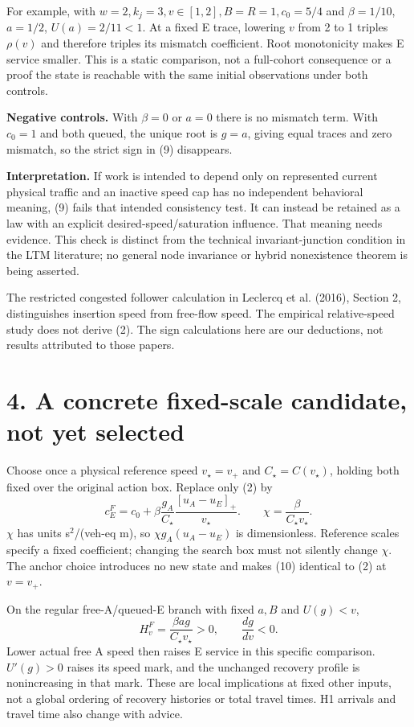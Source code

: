 \documentclass[11pt,a4paper]{article}
\newcommand{\pos}[1]{[#1]_+}
\begin{document}
For example, with $w=2,k_j=3,v\in[1,2],B=R=1,c_0=5/4$ and
$\beta=1/10$, $a=1/2$, $U(a)=2/11<1$. At a fixed E trace, lowering
$v$ from 2 to 1 triples $\rho(v)$ and therefore triples its mismatch
coefficient. Root monotonicity makes E service smaller. This is a static
comparison, not a full-cohort consequence or a proof the state is reachable
with the same initial observations under both controls.

\textbf{Negative controls.} With $\beta=0$ or $a=0$ there is no mismatch
term. With $c_0=1$ and both queued, the unique root is $g=a$, giving equal
traces and zero mismatch, so the strict sign in (9) disappears.

\textbf{Interpretation.} If work is intended to depend only on represented
current physical traffic and an inactive speed cap has no independent
behavioral meaning, (9) fails that intended consistency test. It can instead
be retained as a law with an explicit desired-speed/saturation influence.
That meaning needs evidence. This check is distinct from the technical
invariant-junction condition in the LTM literature; no general node
invariance or hybrid nonexistence theorem is being asserted.

The restricted congested follower calculation in Leclercq et al. (2016),
Section 2, distinguishes insertion speed from free-flow speed. The empirical
relative-speed study does not derive (2). The sign calculations here are
our deductions, not results attributed to those papers.

\newpage
\section*{4. A concrete fixed-scale candidate, not yet selected}
Choose once a physical reference speed $v_\star=v_+$ and
$C_\star=C(v_\star)$, holding both fixed over the original action box.
Replace only (2) by
\begin{equation}
c_E^{F}=c_0+\beta\frac{g_A}{C_\star}
                  \frac{\pos{u_A-u_E}}{v_\star}.
\qquad
\chi=\frac{\beta}{C_\star v_\star}.\tag{10}
\end{equation}
$\chi$ has units s$^2$/(veh-eq m), so $\chi g_A(u_A-u_E)$ is
dimensionless. Reference scales specify a fixed coefficient; changing the
search box must not silently change $\chi$. The anchor choice introduces
no new state and makes (10) identical to (2) at $v=v_+$.

On the regular free-A/queued-E branch with fixed $a,B$ and $U(g)<v$,
\begin{equation}
H_v^{F}=\frac{\beta a g}{C_\star v_\star}>0,
\qquad \frac{dg}{dv}<0.\tag{11}
\end{equation}
Lower actual free A speed then raises E service in this specific
comparison. $U'(g)>0$ raises its speed mark, and the unchanged recovery
profile is nonincreasing in that mark. These are local implications at
fixed other inputs, not a global ordering of recovery histories or total
travel times. H1 arrivals and travel time also change with advice.
\end{document}
